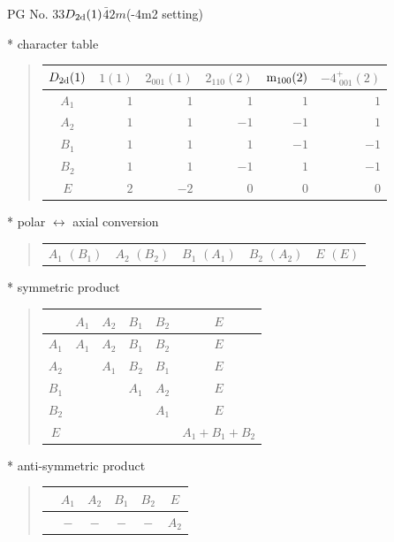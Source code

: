\documentclass[fleqn,8pt,landscape]{jsarticle}
\begin{document}
\setcounter{MaxMatrixCols}{32}

\renewcommand{\tablename}{Table~}
\renewcommand{\figurename}{Figure~}
\begin{center}
\LARGE
PG No. 33\quad$D_{\rm 2d}(1)$\quad$\bar{4}2m$\quad(-4m2 setting)\quad[ tetragonal ]
\end{center}

* character table
\begin{quote}
\begin{tabular}{crrrrr} \hline \hline
$ D_{\rm 2d}(1) $ & $ 1(1) $ & $ 2{}_{001}(1) $ & $ 2{}_{110}(2) $ & $ {\rm m}_{100}(2) $ & $ -4^{+}_{\,\,001}(2) $ \\ \hline
$ A_{1} $ & $ 1 $ & $ 1 $ & $ 1 $ & $ 1 $ & $ 1 $ \\
$ A_{2} $ & $ 1 $ & $ 1 $ & $ -1 $ & $ -1 $ & $ 1 $ \\
$ B_{1} $ & $ 1 $ & $ 1 $ & $ 1 $ & $ -1 $ & $ -1 $ \\
$ B_{2} $ & $ 1 $ & $ 1 $ & $ -1 $ & $ 1 $ & $ -1 $ \\
$ E $ & $ 2 $ & $ -2 $ & $ 0 $ & $ 0 $ & $ 0 $ \\
 \hline \hline
\end{tabular}
\end{quote}

* polar $\leftrightarrow$ axial conversion
\begin{quote}
\begin{tabular}{ccccc}
$ A_{1}\,\,(B_{1}) $ & $ A_{2}\,\,(B_{2}) $ & $ B_{1}\,\,(A_{1}) $ & $ B_{2}\,\,(A_{2}) $ & $ E\,\,(E) $
\end{tabular}
\end{quote}

* symmetric product
\begin{quote}
\begin{tabular}{c|ccccc} \hline \hline
 & $ A_{1} $ & $ A_{2} $ & $ B_{1} $ & $ B_{2} $ & $ E $ \\ \hline
$ A_{1} $ & $ A_{1} $ & $ A_{2} $ & $ B_{1} $ & $ B_{2} $ & $ E $ \\
$ A_{2} $ & $  $ & $ A_{1} $ & $ B_{2} $ & $ B_{1} $ & $ E $ \\
$ B_{1} $ & $  $ & $  $ & $ A_{1} $ & $ A_{2} $ & $ E $ \\
$ B_{2} $ & $  $ & $  $ & $  $ & $ A_{1} $ & $ E $ \\
$ E $ & $  $ & $  $ & $  $ & $  $ & $ A_{1} + B_{1} + B_{2} $ \\
 \hline \hline
\end{tabular}
\end{quote}

* anti-symmetric product
\begin{quote}
\begin{tabular}{cccccc} \hline \hline
 & $ A_{1} $ & $ A_{2} $ & $ B_{1} $ & $ B_{2} $ & $ E $ \\ \hline
$  $ & $ - $ & $ - $ & $ - $ & $ - $ & $ A_{2} $ \\
 \hline \hline
\end{tabular}
\end{quote}
\end{document}

